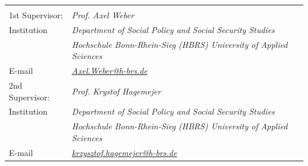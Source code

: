 \begin{titlepage}
{\begin{tabular}{l l}
  \vspace*{12pt}\\
1st Supervisor: & \quad  \textit{Prof. Axel Weber}\\
Institution         & \quad  \textit{Department of Social Policy and Social Security Studies}\\ 
        &                      \quad \textit{Hochschule Bonn-Rhein-Sieg (HBRS) University of Applied Sciences}\\
        
E-mail & \quad  \href{mailto:Weber Axel}{\textit{Axel.Weber@h-brs.de}}

\vspace*{12pt}\\
2nd Supervisor:		& \quad  \textit{Prof. Krystof Hagemejer}\\
Institution         & \quad  \textit{Department of Social Policy and Social Security Studies}\\ 
        &                      \quad \textit{Hochschule Bonn-Rhein-Sieg (HBRS) University of Applied Sciences}\\
E-mail  & \quad  \href{mailto:krzysztof.hagemejer@h-brs.de}{\textit{krzysztof.hagemejer@h-brs.de}}\\

\end{tabular}













\vspace*{12pt}


}

\end{titlepage}
